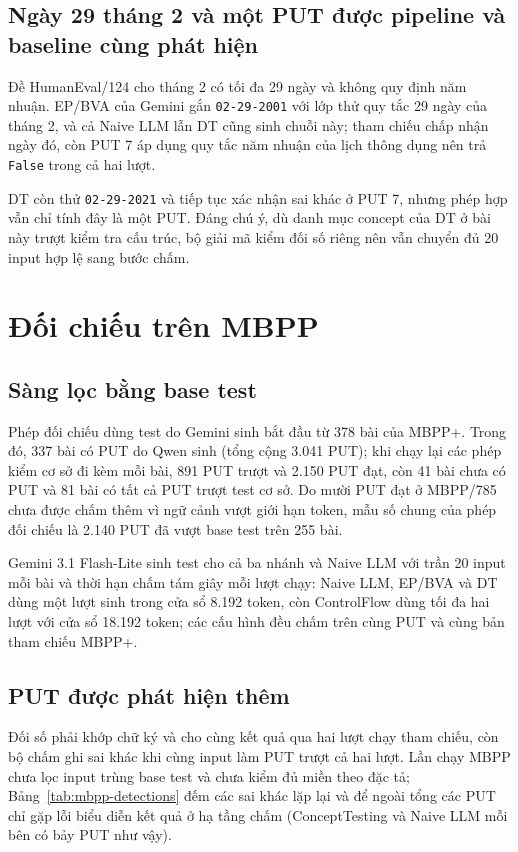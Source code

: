 \subsection{Ngày 29 tháng 2 và một PUT được pipeline và baseline cùng phát hiện}

Đề HumanEval/124 cho tháng 2 có tối đa 29 ngày và không quy định năm nhuận. EP/BVA của Gemini gắn \texttt{02-29-2001} với lớp thử quy tắc 29 ngày của tháng 2, và cả Naive LLM lẫn DT cũng sinh chuỗi này; tham chiếu chấp nhận ngày đó, còn PUT 7 áp dụng quy tắc năm nhuận của lịch thông dụng nên trả \texttt{False} trong cả hai lượt.

DT còn thử \texttt{02-29-2021} và tiếp tục xác nhận sai khác ở PUT 7, nhưng phép hợp vẫn chỉ tính đây là một PUT. Đáng chú ý, dù danh mục concept của DT ở bài này trượt kiểm tra cấu trúc, bộ giải mã kiểm đối số riêng nên vẫn chuyển đủ 20 input hợp lệ sang bước chấm.

\section{Đối chiếu trên MBPP}
\label{sec:mbpp-results}

\subsection{Sàng lọc bằng base test}

Phép đối chiếu dùng test do Gemini sinh bắt đầu từ 378 bài của MBPP+. Trong đó, 337 bài có PUT do Qwen sinh (tổng cộng 3.041 PUT); khi chạy lại các phép kiểm cơ sở đi kèm mỗi bài, 891 PUT trượt và 2.150 PUT đạt, còn 41 bài chưa có PUT và 81 bài có tất cả PUT trượt test cơ sở. Do mười PUT đạt ở MBPP/785 chưa được chấm thêm vì ngữ cảnh vượt giới hạn token, mẫu số chung của phép đối chiếu là 2.140 PUT đã vượt base test trên 255 bài.

Gemini 3.1 Flash-Lite sinh test cho cả ba nhánh và Naive LLM với trần 20 input mỗi bài và thời hạn chấm tám giây mỗi lượt chạy: Naive LLM, EP/BVA và DT dùng một lượt sinh trong cửa sổ 8.192 token, còn ControlFlow dùng tối đa hai lượt với cửa sổ 18.192 token; các cấu hình đều chấm trên cùng PUT và cùng bản tham chiếu MBPP+.

\subsection{PUT được phát hiện thêm}

Đối số phải khớp chữ ký và cho cùng kết quả qua hai lượt chạy tham chiếu, còn bộ chấm ghi sai khác khi cùng input làm PUT trượt cả hai lượt. Lần chạy MBPP chưa lọc input trùng base test và chưa kiểm đủ miền theo đặc tả; Bảng~\ref{tab:mbpp-detections} đếm các sai khác lặp lại và để ngoài tổng các PUT chỉ gặp lỗi biểu diễn kết quả ở hạ tầng chấm (ConceptTesting và Naive LLM mỗi bên có bảy PUT như vậy).

